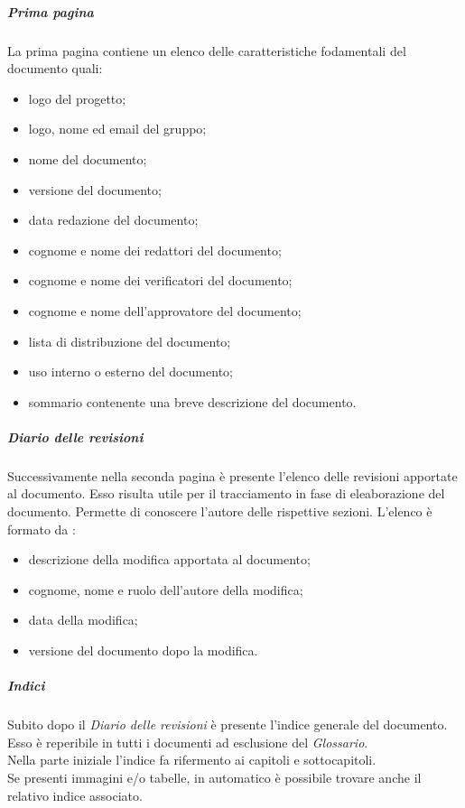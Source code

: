 				\subparagraph{Prima pagina}
				La prima pagina contiene un elenco delle caratteristiche fodamentali del documento quali:
				\begin{itemize}
					\item logo del progetto;
					\item logo, nome ed email del gruppo; 
					\item nome del documento;
					\item versione del documento;
					\item data redazione del documento;
					\item cognome e nome dei redattori del documento;
					\item cognome e nome dei verificatori del documento;
					\item cognome e nome dell'approvatore del documento;
					\item lista di distribuzione del documento;
					\item uso interno o esterno del documento;
					\item sommario contenente una breve descrizione del documento.
				\end{itemize}
				
				\subparagraph{Diario delle revisioni}
				Successivamente nella seconda pagina è presente l'elenco delle revisioni apportate al documento. Esso risulta utile per il tracciamento in fase di eleaborazione del documento. Permette di conoscere l'autore delle rispettive sezioni. L'elenco è formato da :
				\begin{itemize}
					\item descrizione della modifica apportata al documento;
					\item cognome, nome e ruolo dell'autore della modifica;
					\item data della modifica;
					\item versione del documento dopo la modifica.
				\end{itemize}

				\subparagraph{Indici}
				Subito dopo il \emph{Diario delle revisioni} è presente l'indice generale del documento. Esso è reperibile in tutti i documenti ad esclusione del \emph{Glossario}.\\
				Nella parte iniziale l'indice fa rifermento ai capitoli e sottocapitoli.\\
				Se presenti immagini e/o tabelle, in automatico è possibile trovare anche il relativo indice associato.
				
